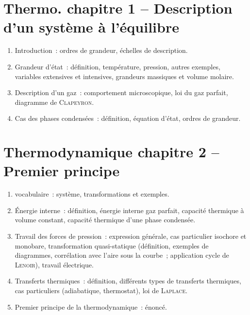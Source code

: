\documentclass[a4paper, 10pt, final, garamond]{book}
\begin{document}
\section*{Thermo. chapitre 1 -- Description d'un système à l'équilibre}
\begin{enumerate}[label=\Roman*]
  \item{Introduction}~: ordres de grandeur, échelles de description.
  \item{Grandeur d'état}~: définition, température, pression, autres exemples,
    variables extensives et intensives, grandeurs massiques et volume molaire.
  \item{Description d'un gaz}~: comportement microscopique, loi du gaz parfait,
    diagramme de \textsc{Clapeyron}.
  \item{Cas des phases condensées}~: définition, équation d'état, ordres de
    grandeur.
\end{enumerate}

\section*{Thermodynamique chapitre 2 -- Premier principe}
\begin{enumerate}[label=\Roman*]
  \item{vocabulaire}~: système, transformations et exemples.
  \item{Énergie interne}~: définition, énergie interne gaz parfait, capacité
    thermique à volume constant, capacité thermique d'une phase condensée.
  \item{Travail des forces de pression}~: expression générale, cas particulier
    isochore et monobare, transformation quasi-statique (définition, exemples de
    diagrammes, corrélation avec l'aire sous la courbe~; application cycle de
    \textsc{Lenoir}), travail électrique.
  \item{Transferts thermiques}~: définition, différents types de transferts
    thermiques, cas particuliers (adiabatique, thermostat), loi de
    \textsc{Laplace}.
  \item{Premier principe de la thermodynamique}~: énoncé.
\end{enumerate}
\end{document}
